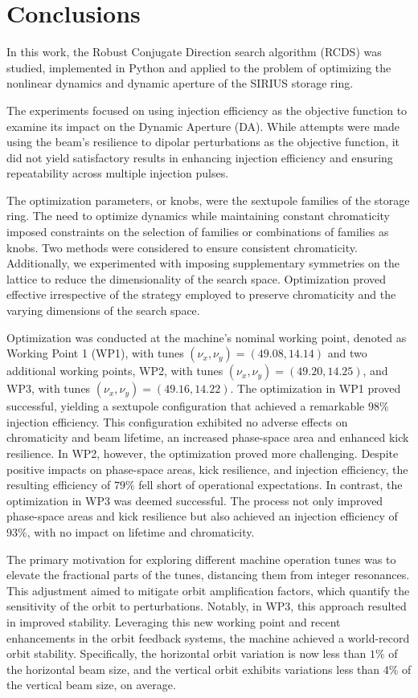 \chapter{Conclusions}

In this work, the Robust Conjugate Direction search algorithm (RCDS) was studied, implemented in Python and applied to the problem of optimizing the nonlinear dynamics and dynamic aperture of the SIRIUS storage ring.

The experiments focused on using injection efficiency as the objective function to examine its impact on the Dynamic Aperture (DA). While attempts were made using the beam's resilience to dipolar perturbations as the objective function, it did not yield satisfactory results in enhancing injection efficiency and ensuring repeatability across multiple injection pulses.

The optimization parameters, or knobs, were the sextupole families of the storage ring. The need to optimize dynamics while maintaining constant chromaticity imposed constraints on the selection of families or combinations of families as knobs. Two methods were considered to ensure consistent chromaticity. Additionally, we experimented with imposing supplementary symmetries on the lattice to reduce the dimensionality of the search space. Optimization proved effective irrespective of the strategy employed to preserve chromaticity and the varying dimensions of the search space.

Optimization was conducted at the machine's nominal working point, denoted as Working Point 1 (WP1), with tunes $(\nu_x, \nu_y)=(49.08, 14.14)$ and two additional working points, WP2, with tunes $(\nu_x, \nu_y)=(49.20, 14.25)$, and WP3, with tunes $(\nu_x, \nu_y)=(49.16, 14.22)$. The optimization in WP1 proved successful, yielding a sextupole configuration that achieved a remarkable $98\%$ injection efficiency. This configuration exhibited no adverse effects on chromaticity and beam lifetime, an increased phase-space area and enhanced kick resilience. In WP2, however, the optimization proved more challenging. Despite positive impacts on phase-space areas, kick resilience, and injection efficiency, the resulting efficiency of $79\%$ fell short of operational expectations. In contrast, the optimization in WP3 was deemed successful. The process not only improved phase-space areas and kick resilience but also achieved an injection efficiency of $93\%$, with no impact on lifetime and chromaticity.

The primary motivation for exploring different machine operation tunes was to elevate the fractional parts of the tunes, distancing them from integer resonances. This adjustment aimed to mitigate orbit amplification factors, which quantify the sensitivity of the orbit to perturbations. Notably, in WP3, this approach resulted in improved stability. Leveraging this new working point and recent enhancements in the orbit feedback systems, the machine achieved a world-record orbit stability. Specifically, the horizontal orbit variation is now less than $1\%$ of the horizontal beam size, and the vertical orbit exhibits variations less than $4\%$ of the vertical beam size, on average.

